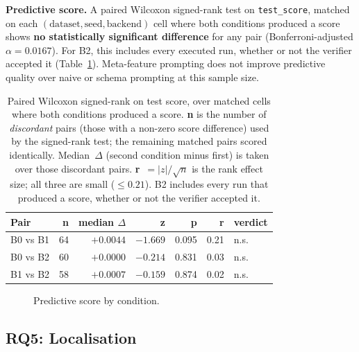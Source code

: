 \textbf{Predictive score.} A paired Wilcoxon signed-rank test on
\texttt{test\_score}, matched on each \((\text{dataset}, \text{seed},
\text{backend})\) cell where both conditions produced a score
shows \textbf{no statistically significant difference} for any pair
(Bonferroni-adjusted $\alpha = 0.0167$). For B2, this includes every
executed run, whether or not the verifier accepted it
(Table~\ref{tab:wilcoxon}). Meta-feature prompting does
not improve predictive quality over naive or schema prompting at this
sample size.

\begin{table}[H]
\centering
\caption{Paired Wilcoxon signed-rank on test score, over matched
cells where both conditions produced a score. \textbf{n} is the number of
\emph{discordant} pairs (those with a non-zero score difference) used
by the signed-rank test; the remaining matched pairs scored
identically. Median~$\Delta$ (second condition minus first) is taken
over those discordant pairs. \textbf{r}~$=|z|/\sqrt{n}$ is the rank
effect size; all three are small ($\leq 0.21$). B2 includes every run
that produced a score, whether or not the verifier accepted it.}
\label{tab:wilcoxon}
\small
\renewcommand{\arraystretch}{1.25}
\begin{tabular}{l r r r r r l}
\toprule
\textbf{Pair} & \textbf{n} & \textbf{median $\Delta$} & \textbf{z} &
\textbf{p} & \textbf{r} & \textbf{verdict} \\
\midrule
B0 vs B1 & 64 & $+0.0044$ & $-1.669$ & 0.095 & 0.21 & n.s. \\
B0 vs B2 & 60 & $+0.0000$ & $-0.214$ & 0.831 & 0.03 & n.s. \\
B1 vs B2 & 58 & $+0.0007$ & $-0.159$ & 0.874 & 0.02 & n.s. \\
\bottomrule
\end{tabular}
\end{table}

\begin{figure}[H]
    \centering
    \caption{Predictive score by condition.}
    \label{fig:scores}
\end{figure}

\subsection{RQ5: Localisation}
\label{sec:rq5}

